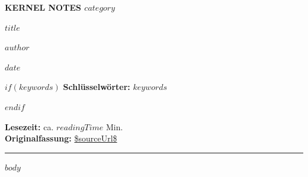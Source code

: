 \documentclass[11pt,a4paper,parskip=half]{scrartcl}
\begin{document}
\thispagestyle{plain}
\begin{center}
  {\sffamily\small\bfseries\color{KernelGreen} KERNEL NOTES \quad\textbullet\quad $category$\par}
  \vspace{7mm}
  {\sffamily\bfseries\LARGE $title$\par}
  \vspace{5mm}
  {\large $author$\par}
  \vspace{1.5mm}
  {\small\color{KernelMuted} $date$\par}
\end{center}

\vspace{5mm}
\begin{abstract}
$abstract$
\end{abstract}

$if(keywords)$
\noindent\textbf{Schlüsselwörter:} $keywords$
\par
$endif$

\vspace{2mm}
{\small
\noindent\textbf{Lesezeit:} ca. $readingTime$ Min.\\
\textbf{Originalfassung:} \url{$sourceUrl$}
\par}

\vspace{5mm}
\hrule
\vspace{7mm}

$body$
\end{document}
